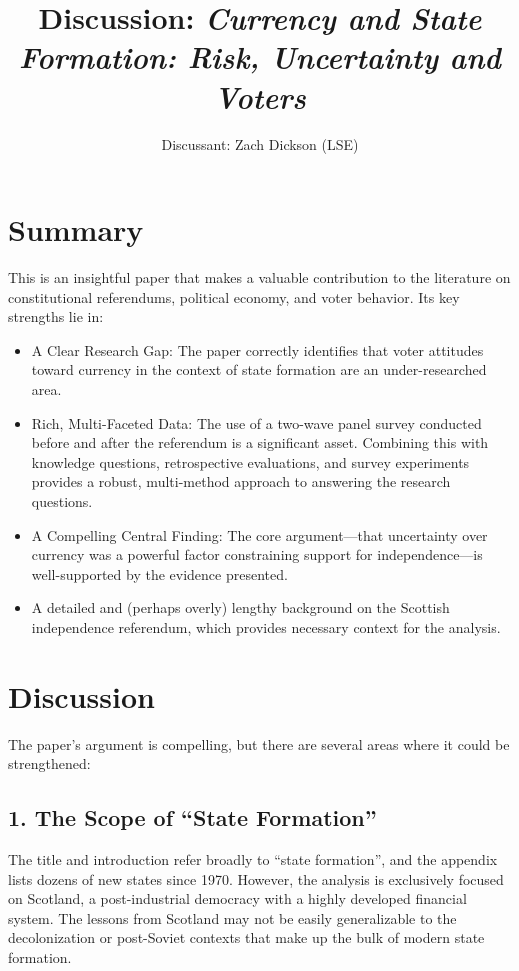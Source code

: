 \documentclass[
  letterpaper,
  DIV=11,
  numbers=noendperiod]{scrartcl}
\title{Discussion: \emph{Currency and State Formation: Risk, Uncertainty
and Voters}}
\author{Discussant: Zach Dickson (LSE)}
\date{}
\providecommand{\tightlist}{%
  \setlength{\itemsep}{0pt}\setlength{\parskip}{0pt}}\usepackage{longtable,booktabs,array}
\begin{document}
\maketitle

\section{Summary}\label{summary}

This is an insightful paper that makes a valuable contribution to the
literature on constitutional referendums, political economy, and voter
behavior. Its key strengths lie in:

\begin{itemize}
\tightlist
\item
  A Clear Research Gap: The paper correctly identifies that voter
  attitudes toward currency in the context of state formation are an
  under-researched area.
\item
  Rich, Multi-Faceted Data: The use of a two-wave panel survey conducted
  before and after the referendum is a significant asset. Combining this
  with knowledge questions, retrospective evaluations, and survey
  experiments provides a robust, multi-method approach to answering the
  research questions.
\item
  A Compelling Central Finding: The core argument---that uncertainty
  over currency was a powerful factor constraining support for
  independence---is well-supported by the evidence presented.
\item
  A detailed and (perhaps overly) lengthy background on the Scottish
  independence referendum, which provides necessary context for the
  analysis.
\end{itemize}

\section{Discussion}\label{discussion}

The paper's argument is compelling, but there are several areas where it
could be strengthened:

\subsection{1. The Scope of ``State
Formation''}\label{the-scope-of-state-formation}

The title and introduction refer broadly to ``state formation'', and the
appendix lists dozens of new states since 1970. However, the analysis is
exclusively focused on Scotland, a post-industrial democracy with a
highly developed financial system. The lessons from Scotland may not be
easily generalizable to the decolonization or post-Soviet contexts that
make up the bulk of modern state formation.
\end{document}
